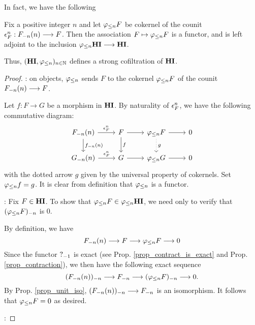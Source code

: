 In fact, we have the following
\begin{prop}\label{prop_HI_lower_slice}
Fix a positive integer $n$ and let $\tlHI{n}F$ be cokernel of the 
counit $\cuHI^n_F: \LHI[n]{\RHI[n]{F}} \to F$. Then the 
association $F \mapsto \tlHI{n}F$ is a functor, and is left 
adjoint to the inclusion $\tlHI{n}\HI \to \HI$.

Thus, $(\HI, \tlHI{n})_{n \in \N}$ defines a strong cofiltration
of $\HI$.
\end{prop}
\begin{proof}
 : on objects, $\tlHI{n}$ sends $F$ to the 
cokernel $\tlHI{n}F$ of the counit $\LHI[n]{\RHI[n]{F}} \to F$.

Let $f: F \to G$ be a morphism in $\HI$.
By naturality of $\cuHI^n_F$, we have the following commutative
diagram:
\[
\begin{tikzcd}
\LHI[n]{\RHI[n]{F}} \arrow{r}{\cuHI_F^n} \arrow{d}{\LHI[n]{\RHI[n]{f}}}
& F \arrow{r} \arrow{d}{f}
& \tlHI{n} F \arrow[dotted]{d}{g} \arrow{r}
& 0 \\
\LHI[n]{\RHI[n]{G}} \arrow{r}{\cuHI_F^n}
& G \arrow{r}
& \tlHI{n}G \arrow{r}
& 0
\end{tikzcd}
\]
with the dotted arrow $g$ given by the universal property of 
cokernels. Set $\tlHI{n}f = g$. It is clear from definition that
$\tlHI{n}$ is a functor.

 : Fix $F \in \HI$. To
show that $\tlHI{n}F \in \tlHI{n}\HI$, we need only to verify
that $\RHI[n]{(\tlHI{n}F)}$ is 0.

By definition, we have
\[
\LHI[n]{\RHI[n]{F}} \to F \to \tlHI{n}F \to 0
\]
Since the functor $\RHI{?}$ is exact (see Prop. 
\ref{prop_contract_is_exact} and Prop. \ref{prop_contraction}), 
we then have the following exact sequence
\[
\RHI[n]{(\LHI[n]{\RHI[n]{F}})} \to \RHI[n]{F} \to
\RHI[n]{(\tlHI{n}F)} \to 0.
\]
By Prop. \ref{prop_unit_iso}, $\RHI[n]{(\LHI[n]{\RHI[n]{F}})}
\to \RHI[n]{F}$ is an isomorphism. It follows that $\tlHI{n}F = 
0$ as desired.

 :
\end{proof}
